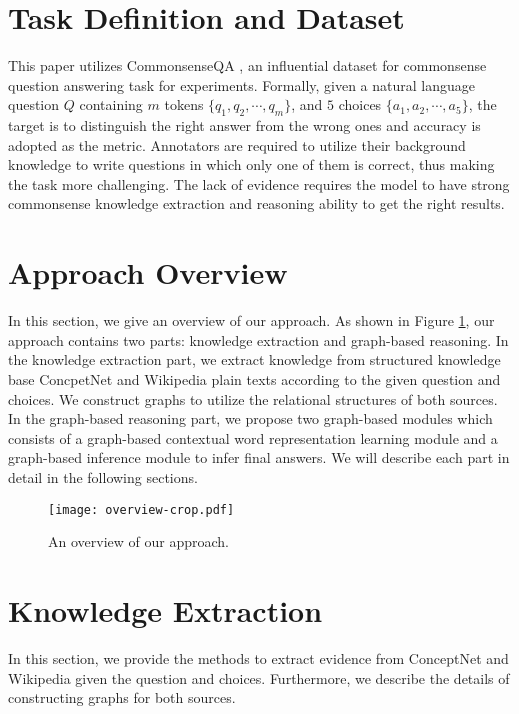 \documentclass[letterpaper]{article} \usepackage{aaai20}  \usepackage{times}  \usepackage{helvet} \usepackage{courier}  \usepackage[hyphens]{url}  \usepackage{graphicx} \urlstyle{rm} \def\UrlFont{\rm}  \usepackage{graphicx}  \frenchspacing  \setlength{\pdfpagewidth}{8.5in}  \setlength{\pdfpageheight}{11in}
\begin{document}
 \section{Task Definition and Dataset}
 This paper utilizes CommonsenseQA \cite{talmor2019commonsenseqa}, an influential dataset for commonsense question answering task for experiments. Formally, given a natural language question $Q$ containing $m$ tokens $\{ q_1, q_2, \cdots, q_m\}$, and $5$ choices $\{ a_1, a_2, \cdots, a_5\}$, the target is to distinguish the right answer from the wrong ones and accuracy is adopted as the metric. Annotators are required to utilize their background knowledge to write questions in which only one of them is correct, thus making the task more challenging. 
The lack of evidence requires the model to have strong commonsense knowledge extraction and reasoning ability to get the right results.

\section{Approach Overview}
In this section, we give an overview of our approach. As shown in Figure \ref{fig:overview}, our approach contains two parts: knowledge extraction and graph-based reasoning. In the knowledge extraction part, we extract knowledge from structured knowledge base ConcpetNet  and Wikipedia plain texts according to the given question and choices. We construct graphs to utilize the relational structures of both sources. 
In the graph-based reasoning part, we propose two graph-based modules which consists of a graph-based contextual word representation learning module and a graph-based inference module to infer final answers. We will describe each part in detail in the following sections.

\begin{figure}[H]
	\centering
	\texttt{[image: overview-crop.pdf]}
	\caption{An overview of our approach.}
	\label{fig:overview}
\end{figure}


 \section{Knowledge Extraction}

In this section, we provide the methods to extract evidence from ConceptNet and Wikipedia given the question and choices. Furthermore, we describe the details of constructing graphs for both sources.
\end{document}
